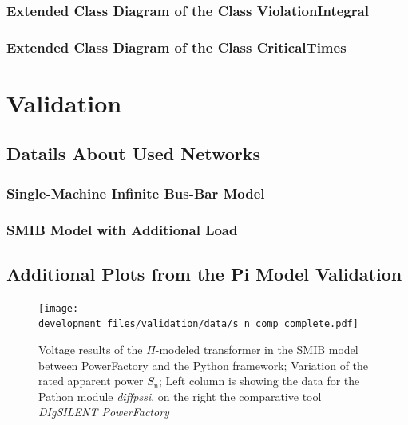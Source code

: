 \subsection{Extended Class Diagram of the Class ViolationIntegral}
\subsection{Extended Class Diagram of the Class CriticalTimes}



\chapter{Validation}
\label{app:validation}

\section{Datails About Used Networks}
\label{app:networks}

\subsection{Single-Machine Infinite Bus-Bar Model}
\label{app:smib-model}


\subsection{SMIB Model with Additional Load}
\label{app:smib-w-load}



\section{Additional Plots from the  Pi Model Validation}
\label{app:add-validation-plots}

\begin{figure}[H]
    \centering
    \texttt{[image: development\_files/validation/data/s\_n\_comp\_complete.pdf]}
    \caption[Model results concerning the variation of the rated apparent power]{Voltage results of the $\Pi$-modeled transformer in the \acs{SMIB} model between PowerFactory and the Python framework; Variation of the rated apparent power $S_\mathrm{n}$; Left column is showing the data for the Pathon module \textit{diffpssi}, on the right the comparative tool \textit{DIgSILENT PowerFactory}}
    \label{fig:valid-s-compl}
\end{figure}

